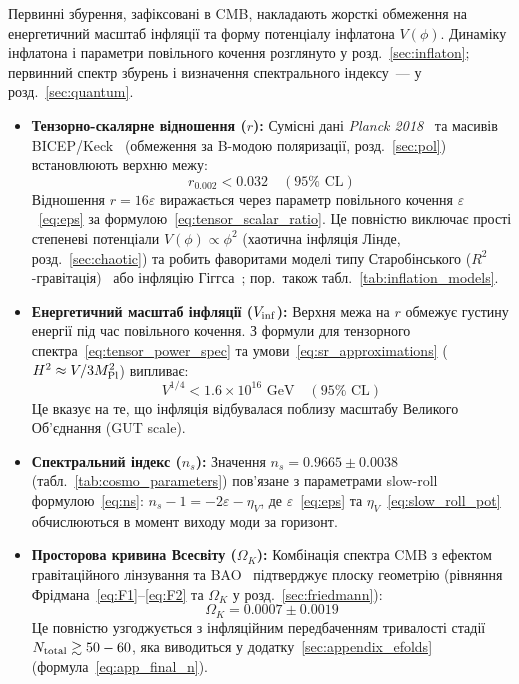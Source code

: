 Первинні збурення, зафіксовані в CMB, накладають жорсткі обмеження на енергетичний масштаб інфляції та форму потенціалу інфлатона $V(\phi)$. Динаміку інфлатона і параметри повільного кочення розглянуто у розд.~\ref{sec:inflaton}; первинний спектр збурень і визначення спектрального індексу~--- у розд.~\ref{sec:quantum}.
\begin{itemize}
    \item \textbf{Тензорно-скалярне відношення ($r$):} Сумісні дані \textit{Planck 2018}~\cite{planck_2018} та масивів BICEP/Keck~\cite{bicep_keck_2021} (обмеження за B-модою поляризації, розд.~\ref{sec:pol}) встановлюють верхню межу:
    \[ r_{0.002} < 0.032 \quad (95\% \text{ CL}) \]
    Відношення $r = 16\varepsilon$ виражається через параметр повільного кочення $\varepsilon$~\eqref{eq:eps} за формулою~\eqref{eq:tensor_scalar_ratio}. Це повністю виключає прості степеневі потенціали $V(\phi) \propto \phi^2$ (хаотична інфляція Лінде, розд.~\ref{sec:chaotic}) та робить фаворитами моделі типу Старобінського ($R^2$-гравітація)~\cite{starobinsky_1980} або інфляцію Гіггса~\cite{bezrukov_2008}; пор.~також табл.~\ref{tab:inflation_models}.

    \item \textbf{Енергетичний масштаб інфляції ($V_{\rm inf}$):} Верхня межа на $r$ обмежує густину енергії під час повільного кочення. З формули для тензорного спектра~\eqref{eq:tensor_power_spec} та умови~\eqref{eq:sr_approximations} ($H^2 \approx V/3M_{\rm Pl}^2$) випливає:
    \[ V^{1/4} < 1.6 \times 10^{16} \text{ GeV} \quad (95\% \text{ CL}) \]
    Це вказує на те, що інфляція відбувалася поблизу масштабу Великого Об'єднання (GUT scale).

    \item \textbf{Спектральний індекс ($n_s$):} Значення $n_s = 0.9665 \pm 0.0038$ (табл.~\ref{tab:cosmo_parameters}) пов'язане з параметрами slow-roll формулою~\eqref{eq:ns}: $n_s - 1 = -2\varepsilon - \eta_V$, де $\varepsilon$~\eqref{eq:eps} та $\eta_V$~\eqref{eq:slow_roll_pot} обчислюються в момент виходу моди за горизонт.

    \item \textbf{Просторова кривина Всесвіту ($\Omega_K$):} Комбінація спектра CMB з ефектом гравітаційного лінзування та BAO~\cite{eisenstein_2005} підтверджує плоску геометрію (рівняння Фрідмана~\eqref{eq:F1}--\eqref{eq:F2} та $\Omega_K$ у розд.~\ref{sec:friedmann}):
    \[ \Omega_K = 0.0007 \pm 0.0019 \]
    Це повністю узгоджується з інфляційним передбаченням тривалості стадії $N_{\rm total} \gtrsim 50-60$, яка виводиться у додатку~\ref{sec:appendix_efolds} (формула~\eqref{eq:app_final_n}).
\end{itemize}

